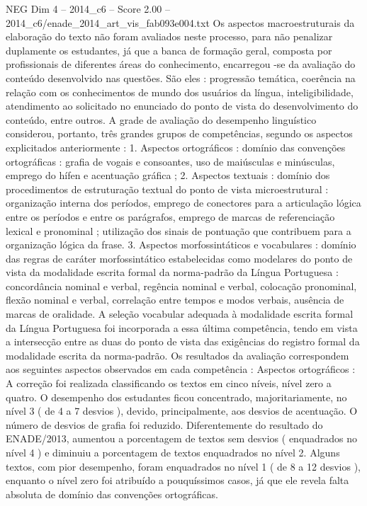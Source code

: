 \begin{textsample}{NEG Dim 4 – 2014\_c6 – Score 2.00 – 2014\_c6/enade\_2014\_art\_vis\_fab093e004.txt}
Os aspectos macroestruturais da elaboração do texto não foram avaliados neste processo, para não penalizar duplamente os estudantes, já que a banca de formação geral, composta por profissionais de diferentes áreas do conhecimento, encarregou -se da avaliação do conteúdo desenvolvido nas questões.
São eles : progressão temática, coerência na relação com os conhecimentos de mundo dos usuários da língua, inteligibilidade, atendimento ao solicitado no enunciado do ponto de vista do desenvolvimento do conteúdo, entre outros.
A grade de avaliação do desempenho linguístico considerou, portanto, três grandes grupos de competências, segundo os aspectos explicitados anteriormente : 1.
Aspectos ortográficos : domínio das convenções ortográficas : grafia de vogais e consoantes, uso de maiúsculas e minúsculas, emprego do hífen e acentuação gráfica ; 2.
Aspectos textuais : domínio dos procedimentos de estruturação textual do ponto de vista microestrutural : organização interna dos períodos, emprego de conectores para a articulação lógica entre os períodos e entre os parágrafos, emprego de marcas de referenciação lexical e pronominal ; utilização dos sinais de pontuação que contribuem para a organização lógica da frase. 3.
Aspectos morfossintáticos e vocabulares : domínio das regras de caráter morfossintático estabelecidas como modelares do ponto de vista da modalidade escrita formal da norma-padrão da Língua Portuguesa : concordância nominal e verbal, regência nominal e verbal, colocação pronominal, flexão nominal e verbal, correlação entre tempos e modos verbais, ausência de marcas de oralidade.
A seleção vocabular adequada à modalidade escrita formal da Língua Portuguesa foi incorporada a essa última competência, tendo em vista a intersecção entre as duas do ponto de vista das exigências do registro formal da modalidade escrita da norma-padrão.
Os resultados da avaliação correspondem aos seguintes aspectos observados em cada competência : Aspectos ortográficos : A correção foi realizada classificando os textos em cinco níveis, nível zero a quatro.
O desempenho dos estudantes ficou concentrado, majoritariamente, no nível 3 ( de 4 a 7 desvios ), devido, principalmente, aos desvios de acentuação.
O número de desvios de grafia foi reduzido.
Diferentemente do resultado do ENADE/2013, aumentou a porcentagem de textos sem desvios ( enquadrados no nível 4 ) e diminuiu a porcentagem de textos enquadrados no nível 2.
Alguns textos, com pior desempenho, foram enquadrados no nível 1 ( de 8 a 12 desvios ), enquanto o nível zero foi atribuído a pouquíssimos casos, já que ele revela falta absoluta de domínio das convenções ortográficas.

\end{textsample}
